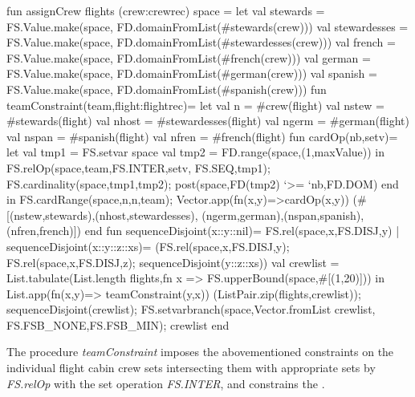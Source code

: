 \documentclass[a4paper,halfparskip]{scrartcl}
\begin{document}
\begin{myverbatim}
fun assignCrew flights (crew:crewrec) space =
    let
       val stewards = FS.Value.make(space,
                      FD.domainFromList(#stewards(crew)))
       val stewardesses = FS.Value.make(space,
                      FD.domainFromList(#stewardesses(crew)))
       val french = FS.Value.make(space,
                      FD.domainFromList(#french(crew)))
       val german = FS.Value.make(space,
                      FD.domainFromList(#german(crew)))
       val spanish = FS.Value.make(space,
                      FD.domainFromList(#spanish(crew)))
       fun teamConstraint(team,flight:flightrec)=
           let
              val n = #crew(flight)
              val nstew = #stewards(flight)
              val nhost = #stewardesses(flight)
              val ngerm = #german(flight)
              val nspan = #spanish(flight)
              val nfren = #french(flight)
              fun cardOp(nb,setv)= 
                  let
                     val tmp1 = FS.setvar space
                     val tmp2 = FD.range(space,(1,maxValue))
                  in
                     FS.relOp(space,team,FS.INTER,setv,
                              FS.SEQ,tmp1);
                     FS.cardinality(space,tmp1,tmp2);
                     post(space,FD(tmp2) `>= `nb,FD.DOM)
                  end
            in
               FS.cardRange(space,n,n,team);
               Vector.app(fn(x,y)=>cardOp(x,y))
               (#[(nstew,stewards),(nhost,stewardesses),
                  (ngerm,german),(nspan,spanish),(nfren,french)])
            end
       fun sequenceDisjoint(x::y::nil)= FS.rel(space,x,FS.DISJ,y)
         | sequenceDisjoint(x::y::z::xs)= 
                          (FS.rel(space,x,FS.DISJ,y);
                           FS.rel(space,x,FS.DISJ,z);
                           sequenceDisjoint(y::z::xs))         
       val crewlist = List.tabulate(List.length flights,fn x =>
                                    FS.upperBound(space,#[(1,20)]))         
    in
       List.app(fn(x,y)=> teamConstraint(y,x))
               (ListPair.zip(flights,crewlist));
       sequenceDisjoint(crewlist);
       FS.setvarbranch(space,Vector.fromList crewlist,
                       FS.FSB_NONE,FS.FSB_MIN); 
       crewlist
    end
\end{myverbatim}


The procedure \emph{teamConstraint} imposes the abovementioned constraints 
on the individual flight cabin crew sets intersecting them with 
appropriate sets by \emph{FS.relOp} with the set operation \emph{FS.INTER},
and constrains the .
\end{document}
